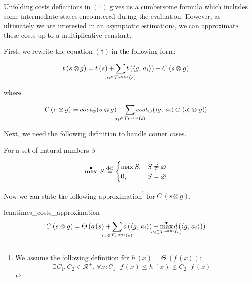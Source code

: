 Unfolding costs definitions in $(\dagger)$ gives us a cumbersome formula which 
includes some intermediate states encountered during the evaluation. However, as ultimately
we are interested in an asymptotic estimations, we can approximate these costs up to a multiplicative constant.
{ \color{red}
First, we rewrite the equation $(\dagger)$ in the following form:

\[ t\,(s \otimes g)  =  t\,(s) + \smashoperator[lr]{\sum\limits_{a_i \in \tra{s}}} t\,(\taskst{g}{a_i}) + C\,(s \otimes g) \]

where

\[ C\,(s \otimes g) = \costconj{s}{g} + \smashoperator[lr]{\sum\limits_{a_i \in \tra{s}}} \costdisj{\taskst{g}{a_i}}{(s'_i \otimes g)} \]
}
Next, we need the following definition to handle corner cases.

\begin{comment}
\begin{definition}
Let $E$ be a set of environments, $g$~--- a goal. Then we call the value

\[
\alpha\,(g, E) = \argmax{e \in E} d\,(\taskst{g}{e})
\]

a \emph{pincipal environment}.
\end{definition}

In other words, $\alpha\,(g, E)$ is an element of $E$ which delivers the longest trace of $g$.
\end{comment}

\begin{definition}

For a set of natural numbers $S$

\[
\max^{\bullet} \, S \overset{\mathrm{def}}{=}
\begin{cases}
\max S,  & S \ne \varnothing \\
0, & S = \varnothing\\
\end{cases}
\]

\end{definition}

{ \color{red}
Now we can state the following approximation\footnote{We assume the following definition for
$h\,(x) = \Theta\,(f\,(x))$: \[\exists C_1, C_2 \in \mathcal{R^{+}}, \, \forall x : C_1 \cdot f\,(x) \le h\,(x) \le C_2 \cdot f\,(x) \]}
for $C\,(s \otimes g)$.

\begin{replemma}{lem:times_costs_approximation}
\[
C\,(s \otimes g) =
\Theta\,(d\,(s) + \smashoperator[lr]{\sum\limits_{a_i \in \tra{s}}} d\,(\taskst{g}{a_i}) - \smashoperator{\maxd\limits_{a_i \in \tra{s}}} d\,(\taskst{g}{a_i}))	
\]
\end{replemma}

}

